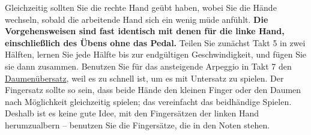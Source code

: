 Gleichzeitig sollten Sie die rechte Hand geübt haben, wobei Sie die Hände wechseln, sobald die arbeitende Hand sich ein wenig müde anfühlt.
\textbf{Die Vorgehensweisen sind fast identisch mit denen für die linke Hand, einschließlich des Übens ohne das Pedal.}
Teilen Sie zunächst Takt 5 in zwei Hälften, lernen Sie jede Hälfte bis zur endgültigen Geschwindigkeit, und fügen Sie sie dann zusammen.
Benutzen Sie für das ansteigende Arpeggio in Takt 7 den \hyperref[c1iii5a]{Daumenübersatz}, weil es zu schnell ist, um es mit Untersatz zu spielen.
Der Fingersatz sollte so sein, dass beide Hände den kleinen Finger oder den Daumen nach Möglichkeit gleichzeitig spielen; das vereinfacht das beidhändige Spielen.
Deshalb ist es keine gute Idee, mit den Fingersätzen der linken Hand herumzualbern -- benutzen Sie die Fingersätze, die in den Noten stehen.

